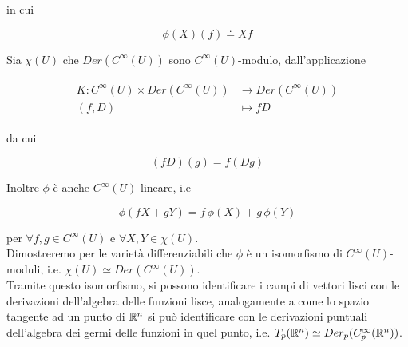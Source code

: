 in cui

\begin{equation}
	\phi(X) (f) \doteq X f
\end{equation}

Sia $ \chi(U) $ che $ Der(C^{\infty}(U)) $ sono $ C^{\infty}(U) $-modulo, dall'applicazione

\begin{align}
	\begin{split}
		K : C^{\infty}(U) \times Der(C^{\infty}(U)) &\to Der(C^{\infty}(U))\\
		(f,D) &\mapsto f D
	\end{split}
\end{align}

da cui

\begin{equation}
	(f D) (g) = f (D g)
\end{equation}

Inoltre $ \phi $ è anche $ C^{\infty}(U) $-lineare, i.e

\begin{equation}
	\phi(f X + g Y) = f \, \phi(X) + g \, \phi(Y)
\end{equation}

per $ \forall f,g \in C^{\infty}(U) $ e $ \forall X,Y \in \chi(U) $.\\
Dimostreremo per le varietà differenziabili che $ \phi $ è un isomorfismo di $ C^{\infty}(U) $-moduli, i.e. $ \chi(U) \simeq Der(C^{\infty}(U)) $.\\
Tramite questo isomorfismo, si possono identificare i campi di vettori lisci con le derivazioni dell'algebra delle funzioni lisce, analogamente a come lo spazio tangente ad un punto di $ \mathbb{R}^{n} $ si può identificare con le derivazioni puntuali dell'algebra dei germi delle funzioni in quel punto, i.e. $ T_{p}(\mathbb{R}^{n}) \simeq Der_{p}(C_{p}^{\infty}(\mathbb{R}^{n})) $.
